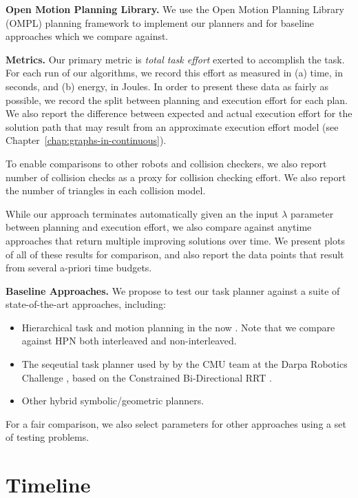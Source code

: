 {\textbf{Open Motion Planning Library.}
We use the Open Motion Planning Library (OMPL)
planning framework \cite{sucan2012ompl}
to implement our planners
and for baseline approaches which we compare against.

\textbf{Metrics.}
Our primary metric is \emph{total task effort} exerted to accomplish
the task.
For each run of our algorithms,
we record this effort as measured in
(a) time, in seconds,
and (b) energy, in Joules.
In order to present these data as fairly as possible,
we record the split between planning and execution effort
for each plan.
We also report the difference between expected and actual
execution effort for the solution path
that may result from an approximate execution effort model
(see Chapter~\ref{chap:graphs-in-continuous}).

To enable comparisons to other robots and collision checkers,
we also report number of collision checks as a proxy for collision
checking effort.
We also report the number of triangles in each collision model.

While our approach terminates automatically
given an the input $\lambda$ parameter between planning and execution
effort,
we also compare against anytime approaches that return multiple
improving solutions over time.
We present plots of all of these results for comparison,
and also report the data points that result from several
a-priori time budgets.

\textbf{Baseline Approaches.}
We propose to test our task planner against a suite of
state-of-the-art approaches,
including:
\begin{itemize}
\item Hierarchical task and motion planning in the now
   \cite{kaelbling2011inthenow}.
   Note that we compare against HPN both
   interleaved and non-interleaved.
\item The seqeutial task planner used by by the CMU team
   at the Darpa Robotics Challenge
   \cite{dellin2014drc},
   based on the Constrained Bi-Directional RRT
   \cite{berenson2009manifolds}.
\item Other hybrid symbolic/geometric planners.
\end{itemize}
For a fair comparison,
we also select parameters for other approaches using a set of testing
problems.

}%

\section{Timeline}

